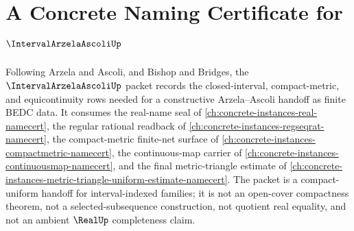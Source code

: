 \chapter{A Concrete Naming Certificate for $\IntervalArzelaAscoliUp$}
\label{ch:concrete-instances-interval-arzela-ascoli-namecert}

Following Arzela and Ascoli, and Bishop and Bridges, the $\IntervalArzelaAscoliUp$ packet records the closed-interval, compact-metric, and equicontinuity rows needed for a constructive Arzela--Ascoli handoff as finite BEDC data. It consumes the real-name seal of \autoref{ch:concrete-instances-real-namecert}, the regular rational readback of \autoref{ch:concrete-instances-regseqrat-namecert}, the compact-metric finite-net surface of \autoref{ch:concrete-instances-compactmetric-namecert}, the continuous-map carrier of \autoref{ch:concrete-instances-continuousmap-namecert}, and the final metric-triangle estimate of \autoref{ch:concrete-instances-metric-triangle-uniform-estimate-namecert}. The packet is a compact-uniform handoff for interval-indexed families; it is not an open-cover compactness theorem, not a selected-subsequence construction, not quotient real equality, and not an ambient $\RealUp$ completeness claim.

